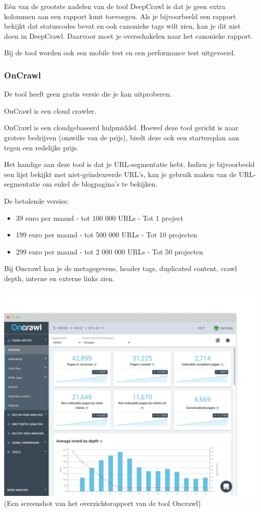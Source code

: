 Eén van de grootste nadelen van de tool DeepCrawl is dat je geen extra kolommen aan een rapport kunt toevoegen. Als je bijvoorbeeld een rapport bekijkt dat statuscodes bevat en ook canonieke tags wilt zien, kan je dit niet doen in DeepCrawl. Daarvoor moet je overschakelen naar het canonieke rapport.

Bij de tool worden ook een mobile test en een performance test uitgevoerd.

\subsubsection{OnCrawl}
\label{ch: OnCrawl}
De tool heeft geen gratis versie die je kan uitproberen. 

OnCrawl is een cloud crawler. 

OnCrawl is een cloudgebaseerd hulpmiddel. Hoewel deze tool gericht is naar grotere bedrijven (omwille van de prijs), biedt deze ook een startersplan aan tegen een redelijke prijs. 

Het handige aan deze tool is dat je URL-segmentatie hebt. Indien je bijvoorbeeld een lijst bekijkt met niet-geïndexeerde URL's, kan je gebruik maken van de URL-segmentatie om enkel de blogpagina's te bekijken. 

De betalende versies: 
\begin{itemize}
\item 39 euro per maand - tot 100 000 URLs - Tot 1 project
\item 199 euro per maand - tot 500 000 URLs - Tot 10 projecten
\item 299 euro per maand - tot 2 000 000 URLs - Tot 50 projecten
\end{itemize}

Bij Oncrawl kan je de metagegevens, header tags, duplicated content, crawl depth, interne en externe links zien. 

\includegraphics[width=\linewidth]{Bachelorproef/bachelor/img/crawl-report.png}
(Een screenshot van het overzichtsrapport van de tool Oncrawl)

